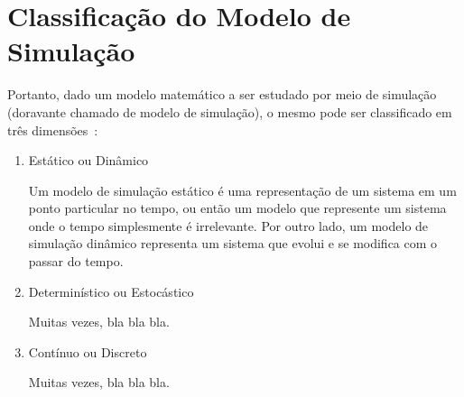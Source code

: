 \section{Classificação do Modelo de Simulação}

Portanto, dado um modelo matemático a ser estudado por meio de simulação
(doravante chamado de modelo de simulação), o mesmo pode ser classificado em
três dimensões~\cite{Banks,Law}:

\begin{enumerate}
\item Estático ou Dinâmico

Um modelo de simulação estático é uma representação de um sistema em um ponto
particular no tempo, ou então um modelo que represente um sistema onde o tempo
simplesmente é irrelevante. Por outro lado, um modelo de simulação dinâmico
representa um sistema que evolui e se modifica com o passar do tempo.

\item Determinístico ou Estocástico

Muitas vezes, bla bla bla.

\item Contínuo ou Discreto

Muitas vezes, bla bla bla.

\end{enumerate}